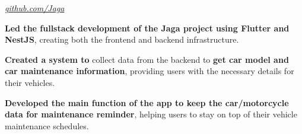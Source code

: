 \documentclass[../main.tex]{subfiles}
\begin{document}
\vspace{0.2 cm}

\begin{twocolentry}{
    \small
    \textit{\href{https://github.com/cattyman919/Jaga}{github.com/Jaga}}
}
\end{twocolentry}

\vspace{0.10 cm}
\begin{onecolentry}
\begin{highlights}
    \item \textbf{Led the fullstack development of the Jaga project using Flutter and NestJS}, creating both the frontend and backend infrastructure.
    \item \textbf{Created a system to} collect data from the backend to \textbf{get car model and car maintenance information}, providing users with the necessary details for their vehicles.
    \item \textbf{Developed the main function of the app to keep the car/motorcycle data for maintenance reminder}, helping users to stay on top of their vehicle maintenance schedules.
\end{highlights}
\end{onecolentry}
\end{document}
